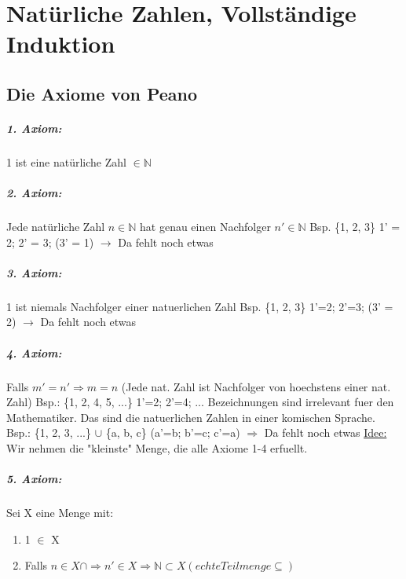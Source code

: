 \chapter{Natürliche Zahlen, Vollständige Induktion}

\section{Die Axiome von Peano}
\paragraph{1. Axiom:}
1 ist eine natürliche Zahl $\in \mathbb{N}$

\paragraph{2. Axiom:}
Jede natürliche Zahl $n \in \mathbb{N}$ hat genau einen Nachfolger $n' \in \mathbb{N}$\newline
Bsp. \{1, 2, 3\} 1' = 2; 2' = 3; (3' = 1) $\rightarrow$ Da fehlt noch etwas

\paragraph{3. Axiom:}
1 ist niemals Nachfolger einer natuerlichen Zahl\newline
Bsp. \{1, 2, 3\} 1'=2; 2'=3; (3' = 2) $\rightarrow$ Da fehlt noch etwas

\paragraph{4. Axiom:}
Falls $m'=n' \Rightarrow m=n$ (Jede nat. Zahl ist Nachfolger von hoechstens einer nat. Zahl)\newline
Bsp.: \{1, 2, 4, 5, ...\}  1'=2; 2'=4; ... Bezeichnungen sind irrelevant fuer den Mathematiker. Das sind die natuerlichen Zahlen in einer komischen Sprache.\newline
Bsp.: \{1, 2, 3, ...\} $\cup$ \{a, b, c\} (a'=b; b'=c; c'=a) $\Rightarrow$ Da fehlt noch etwas\newline
\underline{Idee:} Wir nehmen die "kleinste" Menge, die alle Axiome 1-4 erfuellt.

\paragraph{5. Axiom:}
Sei X eine Menge mit:
\begin{enumerate}
\item 1 $\in$ X
\item Falls $n \in X \cap \Rightarrow n' \in X \Rightarrow \mathbb{N} \subset X (echte Teilmenge \subseteq )$
\end{enumerate}

